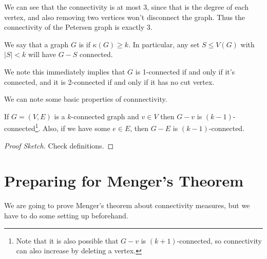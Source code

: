 \documentclass[a4paper]{scrreprt}
\begin{document}
\begin{example}
\begin{center}

	\end{center}
We can see that the connectivity is at most $3$, since that is the degree of each vertex, and also removing two vertices won't disconnect the graph. Thus the connectivity of the Petersen graph is exactly 3.
\end{example}

\begin{definition}[$k$-Connected]
We say that a graph $G$ is  if $\kappa(G) \geq k$. In particular, any set $S \leq V(G)$ with $|S| < k$	will have $G - S$ connected.
\end{definition}

We note this immediately implies that $G$ is 1-connected if and only if it's connected, and it is 2-connected if and only if it has no cut vertex.

We can note some basic properties of connnectivity.

\begin{lemma}
	If $G = (V, E)$ is a $k$-connected graph and $v \in V$ then $G - v$ is $(k - 1)$-connected\footnote{Note that it is also possible that $G - v$ is $(k + 1)$-connected, so connectivity can also increase by deleting a vertex.}. 
	Also, if we have some $e \in E$, then $G - E$ is $(k - 1)$-connected.
\end{lemma}
\begin{proof}[Proof Sketch]
Check definitions.
\end{proof}

\section{Preparing for Menger's Theorem}

We are going to prove Menger's theorem about connectivity measures, but we have to do some setting up beforehand.
\end{document}
